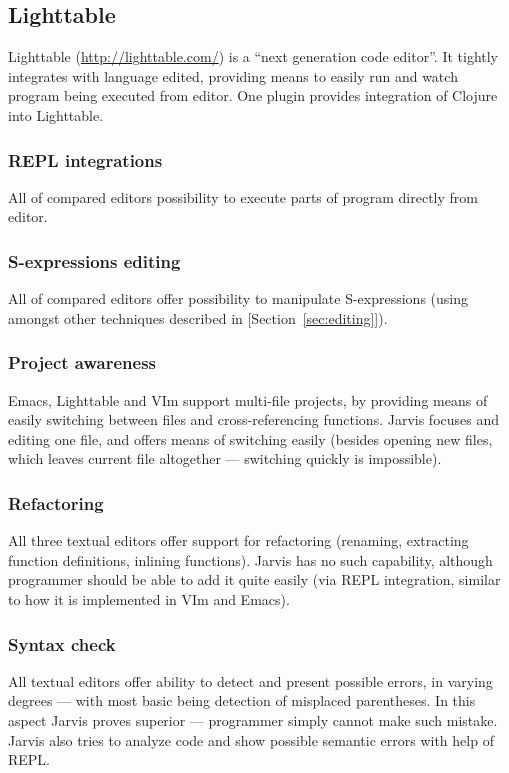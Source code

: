 \documentclass[11pt]{scrartcl}
\begin{document}
\subsection{Lighttable}
Lighttable (\url{http://lighttable.com/}) is a ``next generation code editor''.
It tightly integrates with language edited, providing means to easily run and
watch program being executed from editor. One plugin provides integration of
Clojure into Lighttable.

\subsubsection*{REPL integrations}
All of compared editors possibility to execute parts of program directly from editor.

\subsubsection*{S-expressions editing}
All of compared editors offer possibility to manipulate S-expressions (using
amongst other techniques described in [Section~\ref{sec:editing}]).
    
\subsubsection*{Project awareness}
Emacs, Lighttable and VIm support multi-file projects, by providing means of
easily switching between files and cross-referencing functions. Jarvis focuses
and editing one file, and offers means of switching easily (besides opening new
files, which leaves current file altogether --- switching quickly is impossible).
    
\subsubsection*{Refactoring}
All three textual editors offer support for refactoring (renaming, extracting function
definitions, inlining functions). Jarvis has no such capability, although
programmer should be able to add it quite easily (via REPL integration, similar
to how it is implemented in VIm and Emacs).

    
\subsubsection*{Syntax check}
All textual editors offer ability to detect and present possible errors, in
varying degrees --- with most basic being detection of misplaced parentheses.
In this aspect Jarvis proves superior --- programmer simply cannot make such
mistake. Jarvis also tries to analyze code and show possible semantic errors
with help of REPL.
    
\end{document}

